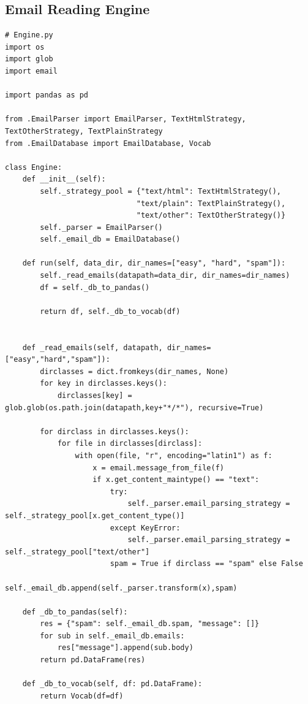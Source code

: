 \documentclass[10pt,a4paper]{article}
\begin{document}
\subsection{Email Reading Engine}
\begin{lstlisting}
# Engine.py
import os
import glob
import email

import pandas as pd

from .EmailParser import EmailParser, TextHtmlStrategy, TextOtherStrategy, TextPlainStrategy
from .EmailDatabase import EmailDatabase, Vocab

class Engine:
    def __init__(self):
        self._strategy_pool = {"text/html": TextHtmlStrategy(), 
                              "text/plain": TextPlainStrategy(),
                              "text/other": TextOtherStrategy()}
        self._parser = EmailParser()
        self._email_db = EmailDatabase()
    
    def run(self, data_dir, dir_names=["easy", "hard", "spam"]):
        self._read_emails(datapath=data_dir, dir_names=dir_names)
        df = self._db_to_pandas()

        return df, self._db_to_vocab(df)
    
    
    def _read_emails(self, datapath, dir_names=["easy","hard","spam"]):
        dirclasses = dict.fromkeys(dir_names, None)
        for key in dirclasses.keys():
            dirclasses[key] = glob.glob(os.path.join(datapath,key+"*/*"), recursive=True)
        
        for dirclass in dirclasses.keys():
            for file in dirclasses[dirclass]:
                with open(file, "r", encoding="latin1") as f:
                    x = email.message_from_file(f)
                    if x.get_content_maintype() == "text":
                        try:
                            self._parser.email_parsing_strategy = self._strategy_pool[x.get_content_type()]
                        except KeyError:
                            self._parser.email_parsing_strategy = self._strategy_pool["text/other"]
                        spam = True if dirclass == "spam" else False
                        self._email_db.append(self._parser.transform(x),spam)

    def _db_to_pandas(self):
        res = {"spam": self._email_db.spam, "message": []}
        for sub in self._email_db.emails:
            res["message"].append(sub.body)
        return pd.DataFrame(res)
    
    def _db_to_vocab(self, df: pd.DataFrame):
        return Vocab(df=df)
\end{lstlisting}
\end{document}
